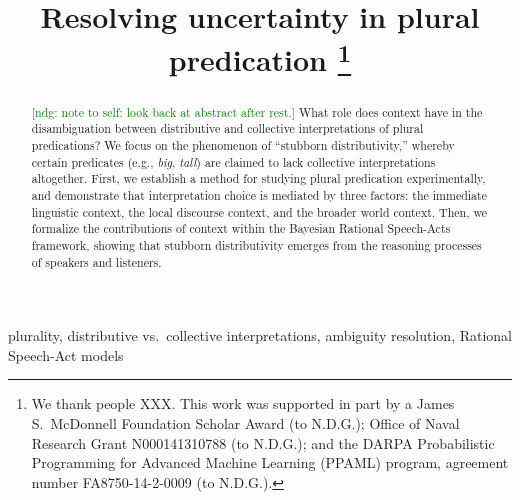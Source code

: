 \documentclass[linguex]{sp}
\title[Resolving uncertainty in plural predication]{Resolving uncertainty in plural predication \thanks{We thank people XXX. This work was supported in part by a James S.~McDonnell Foundation Scholar Award (to N.D.G.); Office of Naval Research Grant N000141310788 (to N.D.G.); and the DARPA Probabilistic Programming for Advanced Machine Learning (PPAML) program, agreement number FA8750-14-2-0009 (to N.D.G.).}}
\author[Scontras \& Goodman]{%
	\spauthor{Gregory Scontras \\ \institute{Stanford University}} \AND
	\spauthor{Noah D.~Goodman \\ \institute{Stanford University}}
}
\newcommand{\ndg}[1]{\textcolor{Green}{[ndg: #1]}}
\begin{document}
\maketitle

\begin{abstract}
\ndg{note to self: look back at abstract after rest.}
	What role does context have in the disambiguation between distributive and collective interpretations of plural predications? We focus on the phenomenon of ``stubborn distributivity,'' whereby certain predicates (e.g., \emph{big}, \emph{tall}) are claimed to lack collective interpretations altogether. First, we establish a method for studying plural predication experimentally, and demonstrate that interpretation choice is mediated by three factors: the immediate linguistic context, the local discourse context, and the broader world context. 
	Then, we formalize the contributions of context within the Bayesian Rational Speech-Acts framework, showing that stubborn distributivity emerges from the reasoning processes of speakers and listeners. 	
\end{abstract}

\begin{keywords}
	plurality, distributive vs.~collective interpretations, ambiguity resolution, Rational Speech-Act models
\end{keywords}
\end{document}
